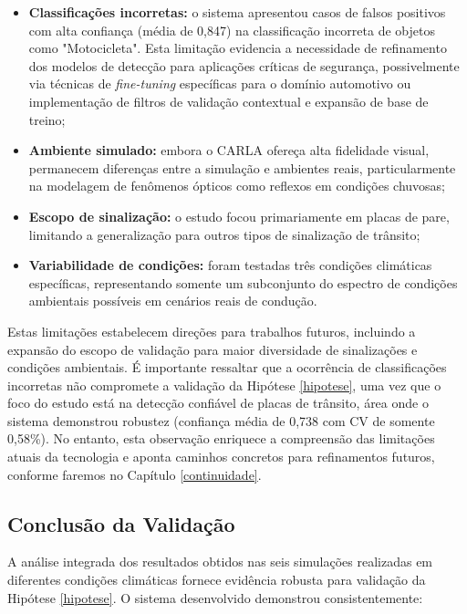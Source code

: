 \begin{itemize}
    \item \textbf{Classificações incorretas:} o sistema apresentou casos de falsos positivos com alta confiança (média de 0,847) na classificação incorreta de objetos como "Motocicleta". Esta limitação evidencia a necessidade de refinamento dos modelos de detecção para aplicações críticas de segurança, possivelmente via técnicas de \textit{fine-tuning} específicas para o domínio automotivo ou implementação de filtros de validação contextual e expansão de base de treino;
    
    \item \textbf{Ambiente simulado:} embora o CARLA ofereça alta fidelidade visual, permanecem diferenças entre a simulação e ambientes reais, particularmente na modelagem de fenômenos ópticos como reflexos em condições chuvosas;
    
    \item \textbf{Escopo de sinalização:} o estudo focou primariamente em placas de pare, limitando a generalização para outros tipos de sinalização de trânsito;
    
    \item \textbf{Variabilidade de condições:} foram testadas três condições climáticas específicas, representando somente um subconjunto do espectro de condições ambientais possíveis em cenários reais de condução.
\end{itemize}

Estas limitações estabelecem direções para trabalhos futuros, incluindo a expansão do escopo de validação para maior diversidade de sinalizações e condições ambientais.
É importante ressaltar que a ocorrência de classificações incorretas não compromete a validação da Hipótese \ref{hipotese}, uma vez que o foco do estudo está na detecção confiável de placas de trânsito, área onde o sistema demonstrou robustez (confiança média de 0,738 com CV de somente 0,58\%). No entanto, esta observação enriquece a compreensão das limitações atuais da tecnologia e aponta caminhos concretos para refinamentos futuros, conforme faremos no Capítulo \ref{continuidade}.

\subsection{Conclusão da Validação}

A análise integrada dos resultados obtidos nas seis simulações realizadas em diferentes condições climáticas fornece evidência robusta para validação da Hipótese \ref{hipotese}. O sistema desenvolvido demonstrou consistentemente:

